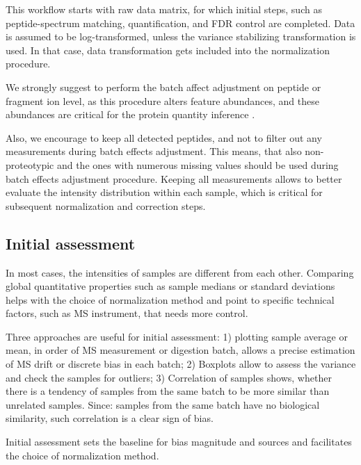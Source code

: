 \documentclass[num-refs]{wiley-article}
\begin{document}
This workflow starts with raw data matrix, for which initial steps, such as peptide-spectrum matching, quantification, and FDR control are completed. Data is assumed to be log-transformed, unless the variance stabilizing transformation \cite{Durbin2002} is used. In that case, data transformation gets included into the normalization procedure. 

We strongly suggest to perform the batch affect adjustment on peptide or fragment ion level, as this procedure alters feature abundances, and these abundances are critical for the protein quantity inference \cite{Clough:2012aa, Teo:2015aa}.  

Also, we encourage to keep all detected peptides, and not to filter out any measurements during batch effects adjustment. This means, that also non-proteotypic and the ones with numerous missing values should be used during batch effects adjustment procedure. Keeping all measurements allows to better evaluate the intensity distribution within each sample, which is critical for subsequent normalization and correction steps.

\subsection{Initial assessment}
In most cases, the intensities of samples are different from each other. Comparing global quantitative properties such as sample medians or standard deviations helps with the choice of normalization method and point to specific technical factors, such as MS instrument, that needs more control. 

Three approaches are useful for initial assessment: 1) plotting sample average or mean, in order of MS measurement or digestion batch, allows a precise estimation of MS drift or discrete bias in each batch; 2) Boxplots allow to assess the variance and check the samples for outliers; 3) Correlation of samples shows, whether there is a tendency of samples from the same batch to be more similar than unrelated samples. Since: samples from the same batch have no biological similarity, such correlation is a clear sign of bias.

Initial assessment sets the baseline for bias magnitude and sources and facilitates the choice of normalization method.
\end{document}
